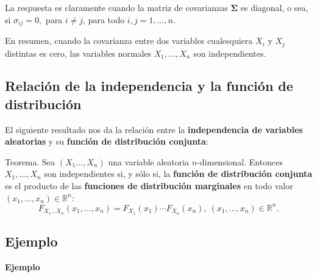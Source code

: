 \documentclass[]{book}
\begin{document}
La respuesta es claramente cuando la matriz de covarianzas \(\mathbf{\Sigma}\) es diagonal, o sea, si \(\sigma_{ij}=0,\) para \(i\neq j\), para todo \(i,j=1,\ldots,n\).

En resumen, cuando la covarianza entre dos variables cualesquiera \(X_i\) y \(X_j\) distintas es cero, las variables normales \(X_1,\ldots,X_n\) son independientes.

\hypertarget{relaciuxf3n-de-la-independencia-y-la-funciuxf3n-de-distribuciuxf3n-1}{%
\subsection{Relación de la independencia y la función de distribución}\label{relaciuxf3n-de-la-independencia-y-la-funciuxf3n-de-distribuciuxf3n-1}}

El siguiente resultado nos da la relación entre la \textbf{independencia de variables aleatorias} y su \textbf{función de distribución conjunta}:

Teorema.
Sea \((X_1\ldots,X_n)\) una variable aleatoria \(n\)-dimensional. Entonces
\(X_1,\ldots,X_n\) son independientes si, y sólo si, la \textbf{función de distribución conjunta} es el producto de las \textbf{funciones de distribución marginales} en todo valor \((x_1,\ldots,x_n)\in\mathbb{R}^n\):
\[
F_{X_1\ldots X_n}(x_1,\ldots,x_n)=F_{X_1}(x_1)\cdots F_{X_n}(x_n),\ (x_1,\ldots,x_n)\in\mathbb{R}^n.
\]

\hypertarget{ejemplo-123}{%
\subsection{Ejemplo}\label{ejemplo-123}}

\textbf{Ejemplo}
\end{document}
